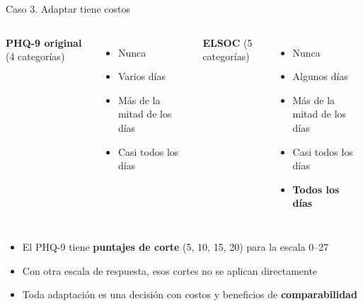 \documentclass[aspectratio=169,11pt]{beamer}
\newcommand{\hl}[1]{\textcolor{marino}{\textbf{#1}}}        %
\newcommand{\hld}[1]{\textcolor{doradooscuro}{\textbf{#1}}} %
\begin{document}
\begin{frame}{Caso 3. Adaptar tiene costos}
\begin{columns}[c]
\textbf{PHQ-9 original} (4 categorías)
\begin{itemize}
  \item[0] Nunca
  \item[1] Varios días
  \item[2] Más de la mitad de los días
  \item[3] Casi todos los días
\end{itemize}
\textbf{ELSOC} (5 categorías)
\begin{itemize}
  \item[1] Nunca
  \item[2] Algunos días
  \item[3] Más de la mitad de los días
  \item[4] Casi todos los días
  \item[5] \hld{Todos los días}
\end{itemize}
\end{columns}
\bigskip
\begin{itemize}
  \item El PHQ-9 tiene \textbf{puntajes de corte} (5, 10, 15, 20) para la escala 0--27
  \item Con otra escala de respuesta, esos cortes no se aplican directamente
  \item Toda adaptación es una decisión con costos y beneficios de \hl{comparabilidad}
\end{itemize}
\end{frame}
\end{document}
